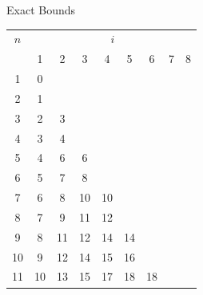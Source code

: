 \begin{frame}{Exact Bounds}
  \vspace{-1cm}
  \begin{table}[!t]
    \label{tab:results}
    \centering
    \small
    \begin{tabular}{c|cccccccc}
      $n$ & \multicolumn{8}{c}{$i$}                                                                                                      \\
          & 1                       & 2  & 3           & 4           & 5           & 6           & 7                 & 8                 \\ \hline
      1   & 0                                                                                                                            \\
      2   & 1                                                                                                                            \\
      3   & 2                       & 3                                                                                                  \\
      4   & 3                       & 4                                                                                                  \\
      5   & 4                       & 6  & 6                                                                                             \\
      6   & 5                       & 7  & 8                                                                                             \\
      7   & 6                       & 8  & 10          & 10                                                                              \\
      8   & 7                       & 9  & 11          & 12                                                                              \\
      9   & 8                       & 11 & 12          & 14          & 14                                                                \\
      10  & 9                       & 12 & 14          & 15          & 16                                                                \\
      11  & 10                      & 13 & 15          & 17          & 18          & 18                                                  \\

\end{tabular}
\end{table}
\end{frame}
